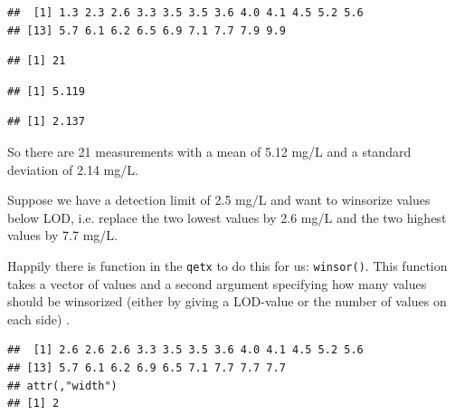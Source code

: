 \documentclass{tufte-book}\usepackage{knitr}
\begin{document}
\begin{knitrout}
\color{fgcolor}\begin{kframe}
\begin{alltt}
\end{alltt}
\begin{verbatim}
##  [1] 1.3 2.3 2.6 3.3 3.5 3.5 3.6 4.0 4.1 4.5 5.2 5.6
## [13] 5.7 6.1 6.2 6.5 6.9 7.1 7.7 7.9 9.9
\end{verbatim}
\begin{alltt}
\end{alltt}
\begin{verbatim}
## [1] 21
\end{verbatim}
\begin{alltt}
\end{alltt}
\begin{verbatim}
## [1] 5.119
\end{verbatim}
\begin{alltt}
\end{alltt}
\begin{verbatim}
## [1] 2.137
\end{verbatim}
\end{kframe}
\end{knitrout}






So there are 21 measurements with a mean of 5.12 mg/L and a standard deviation of 2.14 mg/L. 

Suppose we have a detection limit of 2.5 mg/L and want to winsorize values below
LOD, i.e. replace the two lowest values by 2.6 mg/L and the two highest values by 
7.7 mg/L.

\newpage

Happily there is function in the \verb|qetx| to do this for us: \verb|winsor()|.
This function takes a vector of values and a second argument specifying how 
many values should be winsorized (either by giving a LOD-value or the number of
values on each side) .

\begin{knitrout}
\color{fgcolor}\begin{kframe}
\begin{alltt}
 \hlkwb{<-}   \hlstd{=} \hlstd{)}
\end{alltt}
\begin{verbatim}
##  [1] 2.6 2.6 2.6 3.3 3.5 3.5 3.6 4.0 4.1 4.5 5.2 5.6
## [13] 5.7 6.1 6.2 6.9 6.5 7.1 7.7 7.7 7.7
## attr(,"width")
## [1] 2
\end{verbatim}
\end{kframe}
\end{knitrout}
\end{document}
